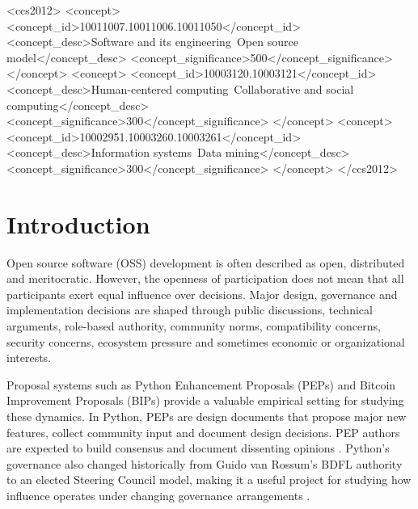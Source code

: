 \documentclass[sigconf,screen]{acmart}
\begin{document}
\begin{CCSXML}
<ccs2012>
 <concept>
  <concept_id>10011007.10011006.10011050</concept_id>
  <concept_desc>Software and its engineering~Open source model</concept_desc>
  <concept_significance>500</concept_significance>
 </concept>
 <concept>
  <concept_id>10003120.10003121</concept_id>
  <concept_desc>Human-centered computing~Collaborative and social computing</concept_desc>
  <concept_significance>300</concept_significance>
 </concept>
 <concept>
  <concept_id>10002951.10003260.10003261</concept_id>
  <concept_desc>Information systems~Data mining</concept_desc>
  <concept_significance>300</concept_significance>
 </concept>
</ccs2012>
\end{CCSXML}



\maketitle

\section{Introduction}

Open source software (OSS) development is often described as open, distributed and meritocratic. However, the openness of participation does not mean that all participants exert equal influence over decisions. Major design, governance and implementation decisions are shaped through public discussions, technical arguments, role-based authority, community norms, compatibility concerns, security concerns, ecosystem pressure and sometimes economic or organizational interests.

Proposal systems such as Python Enhancement Proposals (PEPs) and Bitcoin Improvement Proposals (BIPs) provide a valuable empirical setting for studying these dynamics. In Python, PEPs are design documents that propose major new features, collect community input and document design decisions. PEP authors are expected to build consensus and document dissenting opinions \cite{pep1}. Python's governance also changed historically from Guido van Rossum's BDFL authority to an elected Steering Council model, making it a useful project for studying how influence operates under changing governance arrangements \cite{pep13}.
\end{document}
